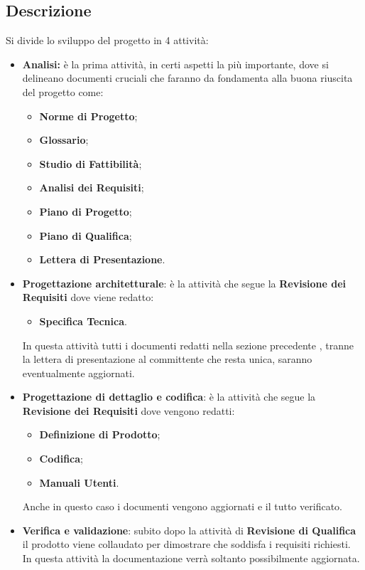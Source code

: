 \documentclass[12pt,a4paper]{article}
\begin{document}
\subsection{Descrizione}

Si divide lo sviluppo del progetto in 4 attività:
\begin{itemize}
	\item \textbf{Analisi:} è la prima attività, in certi aspetti la più importante, dove si delineano documenti cruciali che faranno da fondamenta alla buona riuscita del progetto come:
	\begin{itemize}
		\item \textbf{Norme di Progetto};
		\item \textbf{Glossario};
		\item \textbf{Studio di Fattibilità};
		\item \textbf{Analisi dei Requisiti};
		\item \textbf{Piano di Progetto};
		\item \textbf{Piano di Qualifica};
		\item \textbf{Lettera di Presentazione}.
	\end{itemize}
	\item \textbf{Progettazione architetturale}: è la attività che segue la \textbf{Revisione dei Requisiti} dove viene redatto:
	\begin{itemize}
		\item \textbf{Specifica Tecnica}. 
	\end{itemize} 
	In questa attività tutti i documenti redatti nella sezione precedente , tranne la lettera di presentazione al committente che resta unica, saranno eventualmente aggiornati.
	\item \textbf{Progettazione di dettaglio e codifica}: è la attività che segue la \textbf{Revisione dei Requisiti} dove vengono redatti:
	\begin{itemize}
		\item \textbf{Definizione di Prodotto};
		\item \textbf{Codifica};
		\item \textbf{Manuali Utenti}.
	\end{itemize}
	Anche in questo caso i documenti vengono aggiornati e il tutto verificato.
	\item \textbf{Verifica e validazione}: subito dopo la attività di \textbf{Revisione di Qualifica} il prodotto viene collaudato per dimostrare che soddisfa i requisiti richiesti.
	\\In questa attività la documentazione verrà soltanto possibilmente aggiornata.
\end{itemize}
\end{document}
